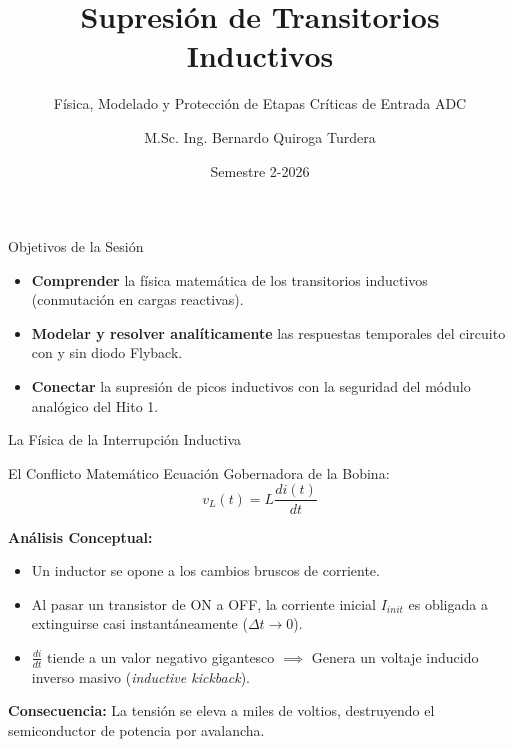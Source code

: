 \documentclass[10pt, aspectratio=169]{beamer}
\title[Transitorios y Flyback]{Supresión de Transitorios Inductivos}
\subtitle{Física, Modelado y Protección de Etapas Críticas de Entrada ADC}
\author{M.Sc. Ing. Bernardo Quiroga Turdera}
\institute[UCB Tarija]{Circuitos Electrónicos III (IMT-221) - Sesión 4.2}
\date{Semestre 2-2026}
\begin{document}
\begin{frame}
  \titlepage
\end{frame}

\begin{frame}{Objetivos de la Sesión}
  \begin{itemize}
      \item \textbf{Comprender} la física matemática de los transitorios inductivos (conmutación en cargas reactivas).
      \item \textbf{Modelar y resolver analíticamente} las respuestas temporales del circuito con y sin diodo Flyback.
      \item \textbf{Conectar} la supresión de picos inductivos con la seguridad del módulo analógico del Hito 1.
  \end{itemize}
\end{frame}

\begin{frame}{La Física de la Interrupción Inductiva}
  \begin{block}{El Conflicto Matemático}
      Ecuación Gobernadora de la Bobina:
      \begin{equation*}
          v_L(t) = L \frac{di(t)}{dt}
      \end{equation*}
  \end{block}
  \vspace{0.2cm}
  \textbf{Análisis Conceptual:}
  \begin{itemize}
      \item Un inductor se opone a los cambios bruscos de corriente.
      \item Al pasar un transistor de ON a OFF, la corriente inicial $I_{init}$ es obligada a extinguirse casi instantáneamente ($\Delta t \to 0$).
      \item $\frac{di}{dt}$ tiende a un valor negativo gigantesco $\implies$ Genera un voltaje inducido inverso masivo (\textit{inductive kickback}).
  \end{itemize}
  \alert{\textbf{Consecuencia:}} La tensión se eleva a miles de voltios, destruyendo el semiconductor de potencia por avalancha.
\end{frame}
\end{document}
